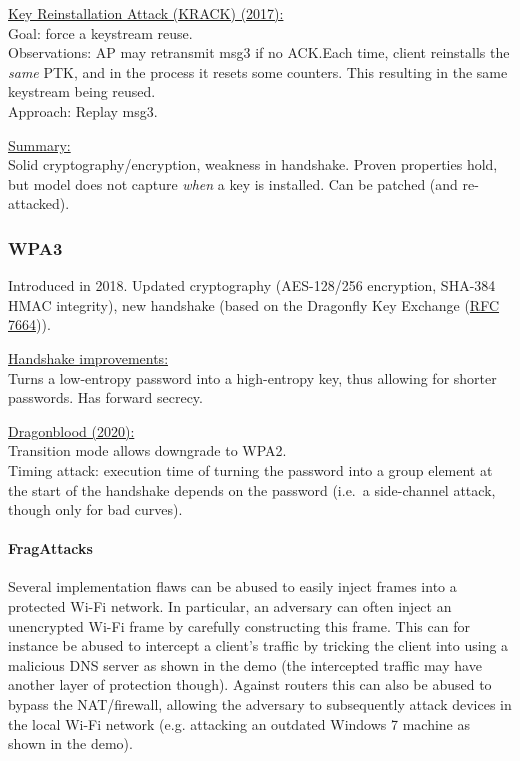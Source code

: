 \href{https://www.krackattacks.com/}{\underline{Key Reinstallation Attack (KRACK)} (2017):} \\
Goal: force a keystream reuse.
\\
Observations: AP may retransmit msg3 if no ACK.\@ Each time, client reinstalls the \textit{same} PTK, and in the process it resets some counters.
This resulting in the same keystream being reused.
\\
Approach: Replay msg3.

\underline{Summary:}\\
Solid cryptography/encryption, weakness in handshake.
Proven properties hold, but model does not capture \textit{when} a key is installed.
Can be patched (and re-attacked).


\subsubsection*{WPA3}

Introduced in 2018.
Updated cryptography (AES-128/256 encryption, SHA-384 HMAC integrity), new handshake (based on the Dragonfly Key Exchange (\href{https://tools.ietf.org/html/rfc7664}{RFC 7664})).

\underline{Handshake improvements:}\\
Turns a low-entropy password into a high-entropy key, thus allowing for shorter passwords.
Has forward secrecy.

\href{https://wpa3.mathyvanhoef.com/}{\underline{Dragonblood} (2020):}\\
Transition mode allows downgrade to WPA2.
\\
Timing attack: execution time of turning the password into a group element at the start of the handshake depends on the password (i.e.\ a side-channel attack, though only for bad curves).


\paragraph{FragAttacks}

Several implementation flaws can be abused to easily inject frames into a protected Wi-Fi network. In particular, an adversary can often inject an unencrypted Wi-Fi frame by carefully constructing this frame. This can for instance be abused to intercept a client's traffic by tricking the client into using a malicious DNS server as shown in the demo (the intercepted traffic may have another layer of protection though). Against routers this can also be abused to bypass the NAT/firewall, allowing the adversary to subsequently attack devices in the local Wi-Fi network (e.g. attacking an outdated Windows 7 machine as shown in the demo).

